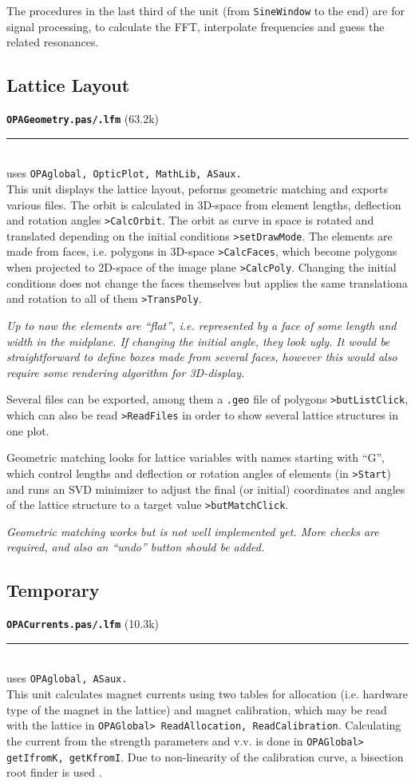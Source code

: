 \documentclass[12pt]{article}
\newcommand\code[1]{{\tt #1}}
\newcommand{\todo}[1]{{\color{red}\em #1}}
\newcommand\opamodule[3]{{\bf \tt #1} #2\\  \rule[3pt]{\textwidth}{0.2pt} \\ {\scriptsize uses \tt  #3}\\[1ex]}
\begin{document}
The procedures in the last third of the unit (from {\tt SineWindow} to the end) are for signal processing, to calculate the FFT, interpolate frequencies and guess the related resonances.\\

\subsection{Lattice Layout}
\opamodule{OPAGeometry.pas/.lfm}{(63.2k)}{OPAglobal, OpticPlot, MathLib, ASaux.}
This unit displays the lattice layout, peforms geometric matching and exports various files.
The orbit is calculated in 3D-space from element lengths, deflection and rotation angles \code{>CalcOrbit}. The orbit as curve in space is rotated and translated depending on the initial conditions \code{>setDrawMode}.
The elements are made from faces, i.e. polygons in 3D-space \code{>CalcFaces}, which become polygons when projected to 2D-space of the image plane \code{>CalcPoly}. Changing the initial conditions does not change the faces themselves but applies the same translationa and rotation to all of them \code{>TransPoly}.

\todo{Up to now the elements are ``flat'', i.e. represented by a face of some length and width in the midplane. If changing the initial angle, they look ugly. It would be straightforward to define boxes made from several faces, however this would also require some rendering algorithm for 3D-display.}

Several files can be exported, among them a \code{.geo} file of polygons \code{>butListClick}, which can also be read \code{>ReadFiles} in order to show several lattice structures in one plot.

Geometric matching looks for lattice variables with names starting with ``G'', which control lengths and deflection or rotation angles of elements (in \code{>Start}) and runs an SVD minimizer to adjust the final (or initial) coordinates and angles of the lattice structure to a target value \code{>butMatchClick}.

\todo{Geometric matching works but is not well implemented yet. More checks are required, and also an ``undo'' button should be added.}


\subsection{Temporary}
\opamodule{OPACurrents.pas/.lfm}{(10.3k)}{OPAglobal, ASaux.}
This unit calculates magnet currents using two tables for allocation (i.e. hardware type of the magnet in the lattice) and magnet calibration, which may be read with the lattice in \code{OPAGlobal> ReadAllocation, ReadCalibration}. Calculating the current from the strength parameters and v.v. is done in \code{OPAGlobal> getIfromK, getKfromI}. Due to non-linearity of the calibration curve, a bisection root finder is used \cite{numrec}.
\end{document}
